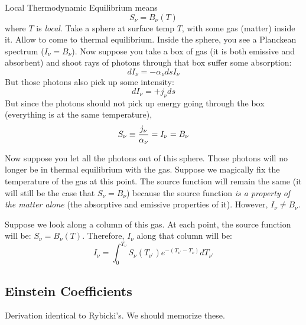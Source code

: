 \documentclass[11pt]{article}
\begin{document}
Local Thermodynamic Equilibrium means 
$$S_\nu=B_\nu(T)$$
where $T$ is {\it local}.
Take a sphere at surface temp $T$, with some gas (matter) inside it.   Allow
to come to thermal equilibrium.  Inside the sphere, 
you see a Planckean spectrum ($I_\nu = B_\nu$).  Now suppose you take a box of
gas (it is both emissive and absorbent) and shoot rays of photons through
that box suffer some absorption: 
$$dI_\nu = -\alpha _\nu ds I_\nu$$
But
those photons also pick up some intensity: 
$$dI_\nu = +j_\nu ds$$
But since the photons
should not pick up energy going through the box (everything is at the same
temperature), 
$$S_\nu\equiv{j_\nu\over\alpha_\nu}=I_\nu=B_\nu$$

Now suppose you let all the photons out of this sphere.  Those photons will
no longer be in thermal equilibrium with the gas.  Suppose we magically fix
the temperature of the gas at this point.  The source function will remain the
same (it will still be the case that $S_\nu = B_\nu$) because the source 
function {\it is a property of the matter alone} (the absorptive and emissive 
properties of it).  However, $I_\nu\ne B_\nu$.\par

Suppose we look along a column of this gas.  At each point, the source
function will be: $S_\nu=B_\nu(T)$.  Therefore, $I_\nu$ along that column
will be: 
\def\np{{\nu^\prime}}
$$I_\nu=\int_0^{T_\nu}{S_\nu(T_\np)e^{-(T_\np-T_\nu)}dT_\np}$$

\subsection*{ Einstein Coefficients}

Derivation identical to Rybicki's.  We should memorize these.\par
\end{document}
